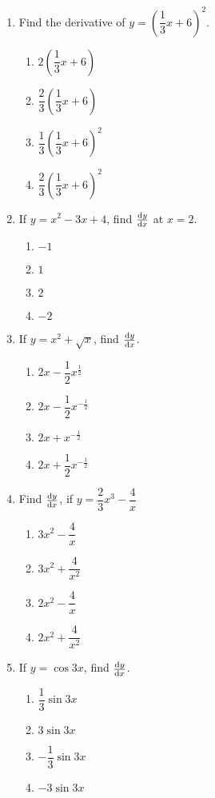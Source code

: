 \begin{multicols}{2}
\begin{enumerate}[label={\arabic*.}]
\item Find the derivative of \(y ={\left(\dfrac{1}{3}x + 6\right)}^{2}\).
	\begin{enumerate}[label={\Alph*.}]
	\item \(2{\left(\dfrac{1}{3}x + 6\right)}\)
	\item \(\dfrac{2}{3}{\left(\dfrac{1}{3}x + 6\right)}\)
	\item \(\dfrac{1}{3}{\left(\dfrac{1}{3}x + 6\right)}^{2}\)
	\item \(\dfrac{2}{3}{\left(\dfrac{1}{3}x + 6\right)}^{2}\)
	\end{enumerate}
\item If \(y = {x}^{2}-3{x}+4\), find \(\dv{y}{x}\) at \(x = 2\).
	\begin{enumerate}[label={\Alph*.}]
	\item \(-1\)
	\item \(1\)
	\item \(2\)
	\item \(-2\)
	\end{enumerate}
\item If  \(y = {x}^{2}+\sqrt{x}\), find \(\dv{y}{x}\).
	\begin{enumerate}[label={\Alph*.}]
	\item \(2x-\dfrac{1}{2}x^{\frac{1}{2}}\)
	\item \(2x-\dfrac{1}{2}x^{-{\frac{1}{2}}}\)
	\item \(2x+x^{-{\frac{1}{2}}}\)
	\item \(2x+\dfrac{1}{2}x^{-{\frac{1}{2}}}\)
	\end{enumerate}
\item Find \(\dv{y}{x}\), if \(y = \dfrac{2}{3}{x}^{3}-\dfrac{4}{x}\)
	\begin{enumerate}[label={\Alph*.}]
	\item \({3}{x}^{2}-\dfrac{4}{x}\)
	\item \({3}{x}^{2}+\dfrac{4}{x^{2}}\)
	\item \({2}{x}^{2}-\dfrac{4}{x}\)
	\item \({2}{x}^{2}+\dfrac{4}{x^{2}}\)
	\end{enumerate}
\item If \(y = \cos{3x}\), find \(\dv{y}{x}\).
	\begin{enumerate}[label={\Alph*.}]
	\item \(\dfrac{1}{3}\sin{3x}\)
	\item \({3}\sin{3x}\)
	\item \(-{\dfrac{1}{3}}\sin{3x}\)
	\item \(-3\sin{3x}\)

\end{enumerate}
\end{enumerate}
\end{multicols}
